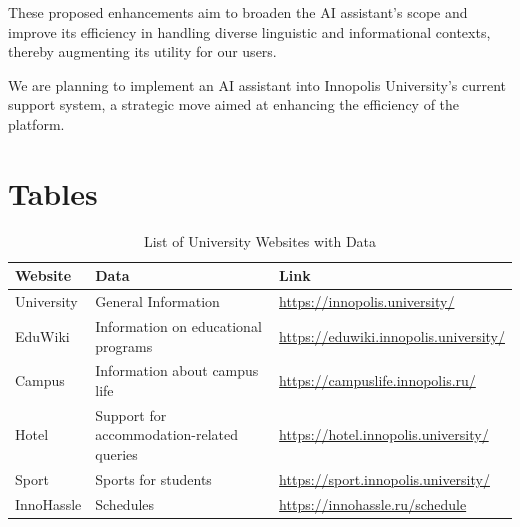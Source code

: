 \documentclass[conference, 11pt]{IEEEtran}
\begin{document}
These proposed enhancements aim to broaden the AI assistant's scope and improve its efficiency in handling diverse linguistic and informational contexts, thereby augmenting its utility for our users.

We are planning to implement an AI assistant into Innopolis University's current support system, a strategic move aimed at enhancing the efficiency of the platform.





\clearpage
\onecolumn
\appendices
\section{Tables}

\begin{table}[h] %
\caption{List of University Websites with Data}
\centering
\begin{tabular}{|l|l|l|}
\hline
\textbf{Website} & \textbf{Data} & \textbf{Link} \\
\hline
University & General Information & \url{https://innopolis.university/} \\
EduWiki & Information on educational programs & \url{https://eduwiki.innopolis.university/} \\
Campus & Information about campus life & \url{https://campuslife.innopolis.ru/} \\
Hotel & Support for accommodation-related queries & \url{https://hotel.innopolis.university/} \\
Sport & Sports for students & \url{https://sport.innopolis.university/} \\
InnoHassle & Schedules & \url{https://innohassle.ru/schedule} \\
\hline
\end{tabular}
\label{tab:university_websites}
\end{table}
\end{document}
